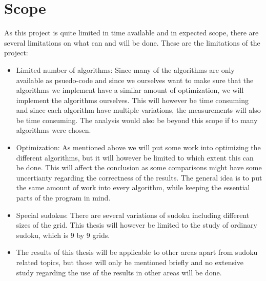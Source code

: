 \documentclass[a4paper,11pt]{kth-mag}
\begin{document}
\section{Scope}
As this project is quite limited in time available and in expected scope, 
there are several limitations on what can and will be done. 
These are the limitations of the project:
\begin{itemize}
    \item Limited number of algorithms: Since many of the algorithms are only available as psuedo-code and since we ourselves want to make sure that the algorithms we implement have a similar amount of optimization, we will implement the algorithms ourselves.
This will however be time consuming and since each algorithm have multiple variations, the measurements will also be time consuming.
The analysis would also be beyond this scope if to many algorithms were chosen.
    \item Optimization: As mentioned above we will put some work into optimizing the different algorithms, but it will however be limited to which extent this can be done.
This will affect the conclusion as some comparisons might have some uncertianty regarding the correctness of the results.
The general idea is to put the same amount of work into every algorithm, while keeping the essential parts of the program in mind.
    \item Special sudokus: There are several variations of sudoku including different sizes of the grid.
This thesis will however be limited to the study of ordinary sudoku, which is 9 by 9 grids.
    \item The results of this thesis will be applicable to other areas apart from sudoku related topics, but those will only be mentioned briefly and no extensive study regarding the use of the results in other areas will be done. 
\end{itemize}
\end{document}
